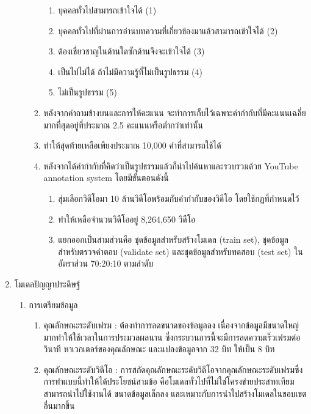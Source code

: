 \begin{enumerate}
\begin{enumerate}
\begin{enumerate}
\begin{enumerate}
				\setlength\itemsep{-0.25em}
				\item บุคคลทั่วไปสามารถเข้าใจได้ (1)
				\item บุคคลทั่วไปที่ผ่านการอ่านบทความที่เกี่ยวข้องมาแล้วสามารถเข้าใจได้ (2)
				\item ต้องเชี่ยวชาญในด้านใดซักด้านจึงจะเข้าใจได้ (3)
				\item เป็นไปไม่ได้ ถ้าไม่มีความรู้ที่ไม่เป็นรูปธรรม (4)
				\item ไม่เป็นรูปธรรม (5)
			\end{enumerate}
			\item หลังจากคำถามข้างบนและการให้คะแนน จะทำการเก็บไว้เฉพาะคำกำกับที่มีคะแนนเฉลี่ยมากที่สุดอยู่ที่ประมาณ 2.5 คะแนนหรือต่ำกว่าเท่านั้น
			\item ทำให้สุดท้ายเหลือเพียงประมาณ 10,000 คำที่สามารถใช้ได้
			\item หลังจากได้คำกำกับที่คิดว่าเป็นรูปธรรมแล้วก็นำไปค้นหาและรวบรวมด้วย YouTube annotation system โดยมีขั้นตอนดังนี้										
			\begin{enumerate}
				\setlength\itemsep{-0.25em}
				\item สุ่มเลือกวิดีโอมา 10 ล้านวิดีโอพร้อมกับคำกำกับของวิดีโอ โดยใช้กฏที่กำหนดไว้
				\item ทำให้เหลือจำนวนวิดีโออยู่ 8,264,650 วิดีโอ
				\item แยกออกเป็นสามส่วนคือ ชุดข้อมูลสำหรับสร้างโมเดล (train set), ชุดข้อมูลสำหรับตรวจคำตอบ (validate set) และชุดข้อมูลสำหรับทดสอบ (test set) ในอัตราส่วน 70:20:10 ตามลำดับ
			\end{enumerate}
		\end{enumerate}
	\end{enumerate}
	\item {โมเดลปัญญาประดิษฐ์}
	\begin{enumerate}
		\setlength\itemsep{-0.25em}
		\item การเตรียมข้อมูล
			\begin{enumerate}  
				\item คุณลักษณะระดับเฟรม : ต้องทำการลดขนาดของข้อมูลลง เนื่องจากข้อมูลมีขนาดใหญ่มากทำให้ใช้เวลาในการประมวลผลนาน ซึ่งกระบวนการนี้จะมีการลดความเร็วเฟรมต่อวินาที 
				หาเวกเตอร์ของคุณลักษณะ และแปลงข้อมูลจาก 32 บิท ให้เป็น 8 บิท
				\item คุณลักษณะระดับวิดีโอ : การสกัดคุณลักษณะระดับวิดีโอจากคุณลักษณะระดับเฟรมซึ่งการทำแบบนี้ทำให้ได้ประโยชน์สามข้อ 
				คือโมเดลทั่วไปที่ไม่ใช่โครงข่ายประสาทเทียมสามารถนำไปใช้งานได้ ขนาดข้อมูลเล็กลง และเหมาะกับการนำไปสร้างโมเดลในขอบเขตอื่นมากขึ้น
			\end{enumerate}	

\end{enumerate}
\end{enumerate}

